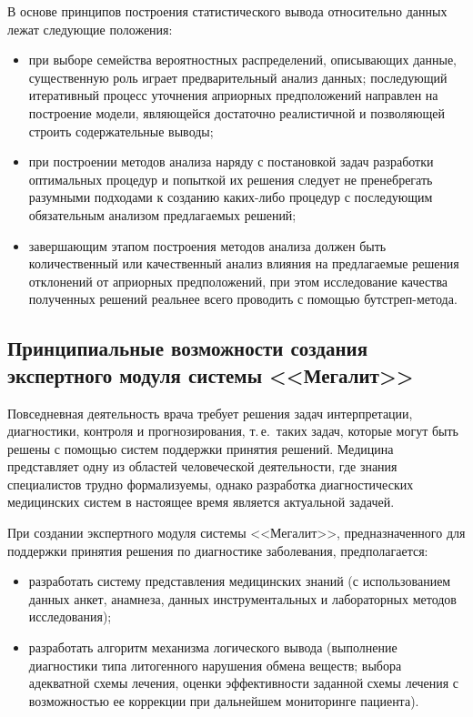\begin{multicols}{2}
      В основе принципов построения статистического вывода относительно данных лежат 
следующие положения:
      \begin{itemize}
\item при выборе семейства вероятностных распределений, описывающих данные, 
существенную роль играет предварительный анализ данных; последующий итеративный 
процесс уточнения априорных предположений направлен на построение модели, являющейся 
достаточно реалистичной и позволяющей строить содержательные выводы;
\item при построении методов анализа наряду с постановкой задач разработки оптимальных 
процедур и попыткой их решения следует не пренебрегать разумными подходами к созданию 
ка\-ких-ли\-бо процедур с последующим обязательным анализом предлагаемых решений; 
\item завершающим этапом построения методов анализа должен быть количественный или 
качественный анализ влияния на предлагаемые реше\-ния отклонений от априорных 
предположений, при этом исследование качества полученных решений реальнее всего 
проводить с по\-мощью бут\-стреп-ме\-тода.
\end{itemize}

\subsection{Принципиальные возможности создания экспертного модуля системы 
<<Мегалит>>}

      Повседневная деятельность врача требует решения задач интерпретации, диагностики, 
контроля и прогнозирования, т.\,е.\ таких задач, которые могут быть решены с помощью 
систем поддержки принятия решений. Медицина представляет одну из областей человеческой 
деятельности, где знания специалистов трудно формализуемы, однако разработка 
диагностических медицинских систем в настоящее время является актуальной задачей.
      
      При создании экспертного модуля системы <<Мегалит>>, предназначенного для 
поддержки принятия решения по диагностике заболевания, предполагается:
      \begin{itemize}
\item разработать систему представления медицинских знаний (с использованием данных 
анкет, анамнеза, данных инструментальных и лабораторных методов исследования);
\item разработать алгоритм механизма логического вывода (выполнение диагностики типа 
литогенного нарушения обмена веществ; выбора адекватной схемы лечения, оценки 
эффективности заданной схемы лечения с возможностью ее коррекции при дальнейшем 
мониторинге пациента).
\end{itemize}
      

\end{multicols}
